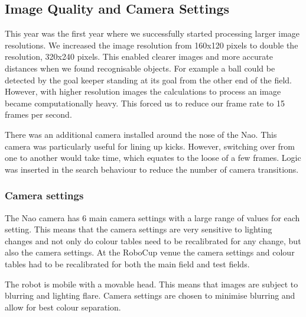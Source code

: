 

\subsection{Image Quality and Camera Settings}
This year was the first year where we successfully started processing larger image resolutions. We increased the image resolution from 160x120 pixels to double the resolution, 320x240 pixels. This enabled clearer images and more accurate distances when we found recognisable objects. For example a ball could be detected by the goal keeper standing at its goal from the other end of the field. However, with higher resolution images the calculations to process an image became computationally heavy. This forced us to reduce our frame rate to 15 frames per second.

There was an additional camera installed around the nose of the Nao. This camera was particularly useful for lining up kicks. However, switching over from one to another would take time, which equates to the loose of a few frames. Logic was inserted in the search behaviour to reduce the number of camera transitions. 

\subsubsection{Camera settings}

The Nao camera has 6 main camera settings with a large range of values for each setting. This means that the camera settings are very sensitive to lighting changes and not only do colour tables need to be recalibrated for any change, but also the camera settings. At the RoboCup venue the camera settings and colour tables had to be recalibrated for both the main field and test fields. 

The robot is mobile with a movable head. This means that images are subject to blurring and lighting flare. Camera settings are chosen to minimise blurring and allow for best colour separation.

